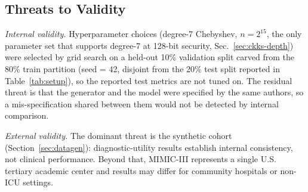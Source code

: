 \documentclass[journal,compsoc]{IEEEtran}
\begin{document}
\subsection{Threats to Validity}

\textit{Internal validity.} Hyperparameter choices (degree-7 Chebyshev,
$n = 2^{15}$, the only parameter set that supports degree-7 at 128-bit
security, Sec.~\ref{sec:ckks-depth}) were selected by grid search on a
held-out 10\% validation split carved from the 80\% train partition (seed =
42, disjoint from the 20\% test split reported in Table~\ref{tab:setup}), so
the reported test metrics are not tuned on. The residual threat is that the
generator and the model were specified by the
same authors, so a mis-specification shared between them would not be detected
by internal comparison.

\textit{External validity.} The dominant threat is the synthetic cohort
(Section~\ref{sec:datagen}): diagnostic-utility results establish internal
consistency, not clinical performance. Beyond that, MIMIC-III represents a
single U.S. tertiary academic center and results may differ for community
hospitals or non-ICU settings.
\end{document}
